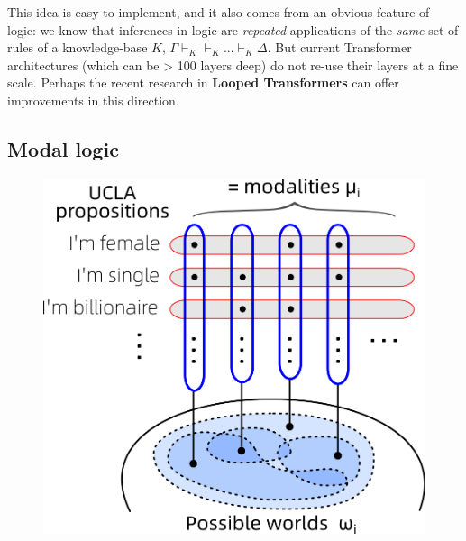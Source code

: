 \documentclass[runningheads]{llncs}
\begin{document}
This idea is easy to implement, and it also comes from an obvious feature of logic:  we know that inferences in logic are \textit{repeated} applications of the \textit{same} set of rules of a knowledge-base $K$, $\Gamma \vdash_K \vdash_K ... \vdash_K \Delta$.  But current Transformer architectures (which can be > 100 layers deep) do not re-use their layers at a fine scale.  Perhaps the recent research in \textbf{Looped Transformers} \cite{Yang2024} \cite{Giannou2023} can offer improvements in this direction.

\subsection{Modal logic}

\begin{figure}
	\includegraphics[scale=.5]{possible-worlds-as-sheaf.png} \qquad

\end{figure}
\end{document}
